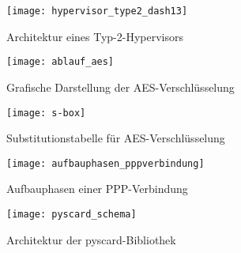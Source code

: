   \begin{figure}[htp]
  \begin{center}
   \texttt{[image: hypervisor\_type2\_dash13]}
  \end{center}
  \caption[Architektur eines Typ-2-Hypervisors]{Architektur eines Typ-2-Hypervisors \cite{dash13}}
  \label{abb:hypervisor_type2}
 \end{figure}

  \begin{figure}[htp]
  \begin{center}
   \texttt{[image: ablauf\_aes]}
  \end{center}
  \caption[Grafische Darstellung der AES-Verschlüsselung]{Grafische Darstellung der AES-Verschlüsselung \cite{paar10}}
  \label{abb:funktion_aes}
 \end{figure}
 
  \begin{figure}[htp]
  \begin{center}
   \texttt{[image: s-box]}
  \end{center}
  \caption[Substitutionstabelle für AES-Verschlüsselung]{Substitutionstabelle für AES-Verschlüsselung \cite{paar10}}
  \label{abb:s-box}
 \end{figure}
 
 \begin{figure}[htp]
  \begin{center}
   \texttt{[image: aufbauphasen\_pppverbindung]}
  \end{center}
  \caption[Aufbauphasen einer PPP-Verbindung]{Aufbauphasen einer PPP-Verbindung \cite{zackercomptia}}
  \label{abb:aufbauphasen_pppverbindung}
 \end{figure}

 \begin{figure}[htp]
  \begin{center}
   \texttt{[image: pyscard\_schema]}
  \end{center}
  \caption[Architektur der pyscard-Bibliothek]{Architektur der pyscard-Bibliothek \cite{pyscardweb}}
  \label{abb:pyscard_schema}
 \end{figure}